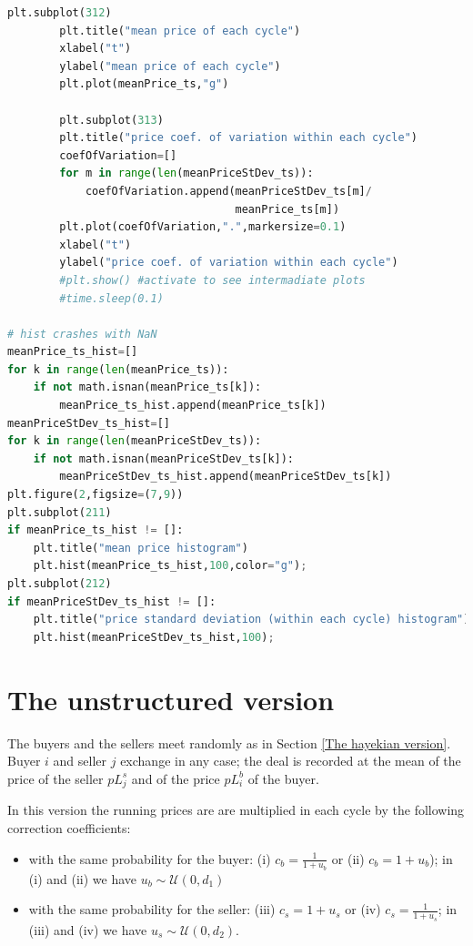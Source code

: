 \documentclass[10pt]{report}
\begin{document}
\begin{lstlisting}[language=Python, caption=The model in the simplified hayekian perspective, label={The model in the simplified hayekian perspective},basicstyle=\ttfamily\footnotesize]
        plt.subplot(312)
        plt.title("mean price of each cycle")
        xlabel("t")
        ylabel("mean price of each cycle")
        plt.plot(meanPrice_ts,"g")
        
        plt.subplot(313)
        plt.title("price coef. of variation within each cycle")
        coefOfVariation=[]
        for m in range(len(meanPriceStDev_ts)):
            coefOfVariation.append(meanPriceStDev_ts[m]/
                                   meanPrice_ts[m])
        plt.plot(coefOfVariation,".",markersize=0.1)
        xlabel("t")
        ylabel("price coef. of variation within each cycle")
        #plt.show() #activate to see intermadiate plots
        #time.sleep(0.1)

# hist crashes with NaN
meanPrice_ts_hist=[]
for k in range(len(meanPrice_ts)): 
    if not math.isnan(meanPrice_ts[k]):
        meanPrice_ts_hist.append(meanPrice_ts[k])
meanPriceStDev_ts_hist=[]
for k in range(len(meanPriceStDev_ts)): 
    if not math.isnan(meanPriceStDev_ts[k]):
        meanPriceStDev_ts_hist.append(meanPriceStDev_ts[k])
plt.figure(2,figsize=(7,9))
plt.subplot(211)
if meanPrice_ts_hist != []:
    plt.title("mean price histogram")
    plt.hist(meanPrice_ts_hist,100,color="g");
plt.subplot(212)
if meanPriceStDev_ts_hist != []:
    plt.title("price standard deviation (within each cycle) histogram")
    plt.hist(meanPriceStDev_ts_hist,100);
\end{lstlisting}


\section{The unstructured version}\label{The unstructured version}

The buyers and the sellers meet randomly as in Section \ref{The hayekian version}. Buyer $i$ and seller $j$ exchange in any case; the deal is recorded at the mean of the price of the seller $pL^s_j$ and of the price $pL^b_i$ of the buyer.

In this version the running prices are  are multiplied in each cycle by the following  correction coefficients:

\begin{itemize}

\item with the same probability for the buyer: (i) $c_b=\frac{1} {1 + u_b}$ or (ii) $c_b=1 + u_b$); in (i) and (ii) we have $u_b\sim\mathcal{U}(0,d_1)$

\item  with the same probability for the seller: (iii) $c_s=1 + u_s$ or (iv) $c_s=\frac{1} {1 + u_s}$; in (iii) and (iv) we have $u_s\sim\mathcal{U}(0,d_2)$.
\end{itemize}
\end{document}
